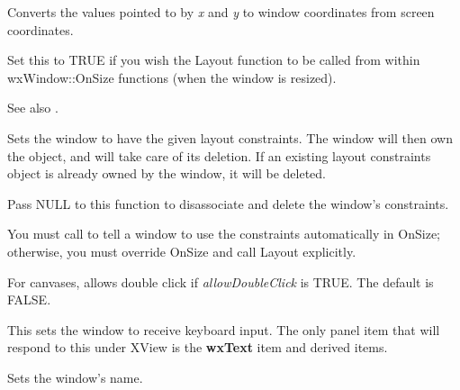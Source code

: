 
Converts the values pointed to by {\it x} and {\it y} to window
coordinates from screen coordinates.

\label{winsetautolayout}


Set this to TRUE if you wish the Layout function to be called
from within wxWindow::OnSize functions (when the window is resized).

See also .

\label{wxwindowsetconstraints}


Sets the window to have the given layout constraints. The window
will then own the object, and will take care of its deletion.
If an existing layout constraints object is already owned by the
window, it will be deleted.

Pass NULL to this function to disassociate and delete the window's
constraints.

You must call  to tell a window to use
the constraints automatically in OnSize; otherwise, you must
override OnSize and call Layout explicitly.

\label{setdoubleclick}


For canvases, allows double click if {\it allowDoubleClick} is TRUE. The default is FALSE.

\label{winsetfocus}


This sets the window to receive keyboard input. The only panel item that will
respond to this under XView is the {\bf wxText} item and derived items.

\label{wxwindowsetname}


Sets the window's name.



